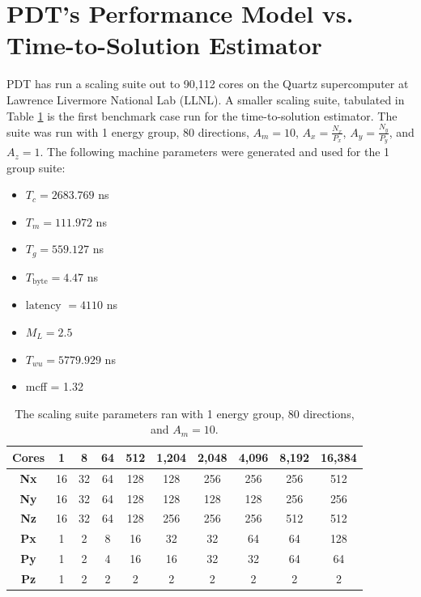 \section{PDT's Performance Model vs. Time-to-Solution Estimator}

PDT has run a scaling suite out to 90,112 cores on the Quartz supercomputer \cite{quartz} at Lawrence Livermore National Lab (LLNL).
A smaller scaling suite, tabulated in Table \ref{scaling_suite} is the first benchmark case run for the time-to-solution estimator.
The suite was run with 1 energy group, 80 directions, $A_m = 10$, $A_x=\frac{N_x}{P_x}$, $A_y=\frac{N_y}{P_y}$, and $A_z = 1$.
The following machine parameters were generated and used for the 1 group suite:
\begin{itemize}
  \item $T_c = 2683.769$ ns
  \item $T_m = 111.972$ ns
  \item $T_g = 559.127$ ns
  \item $T_\text{byte} = 4.47$ ns
  \item $\text{latency }= 4110$ ns
  \item $M_L = 2.5$
  \item $T_{wu} = 5779.929$ ns
  \item mcff = 1.32
\end{itemize}

\begin{table}[H]
  \centering
  \caption{The scaling suite parameters ran with 1 energy group, 80 directions, and $A_m = 10$.}
  \label{scaling_suite}
  \begin{tabular}{c|c|c|c|c|c|c|c|c|c}
    \textbf{Cores} & 1 & 8 & 64 & 512 & 1,204 & 2,048 & 4,096 & 8,192 & 16,384 \\ \hline
    \textbf{Nx} & 16 & 32 & 64 & 128 & 128 & 256 & 256 & 256 & 512 \\ \hline
    \textbf{Ny} & 16 & 32 & 64 & 128 & 128 & 128 & 128 & 256 & 256 \\ \hline
    \textbf{Nz} & 16 & 32 & 64 & 128 & 256 & 256 & 256 & 512 & 512 \\ \hline
    \textbf{Px} & 1  & 2  & 8  & 16  & 32  & 32  & 64  & 64  & 128 \\ \hline
    \textbf{Py} & 1  & 2  & 4  & 16  & 16  & 32  & 32  & 64  & 64  \\ \hline
    \textbf{Pz} & 1  & 2  & 2  & 2   & 2   & 2   & 2   & 2   & 2   \\
  \end{tabular}
\end{table}

